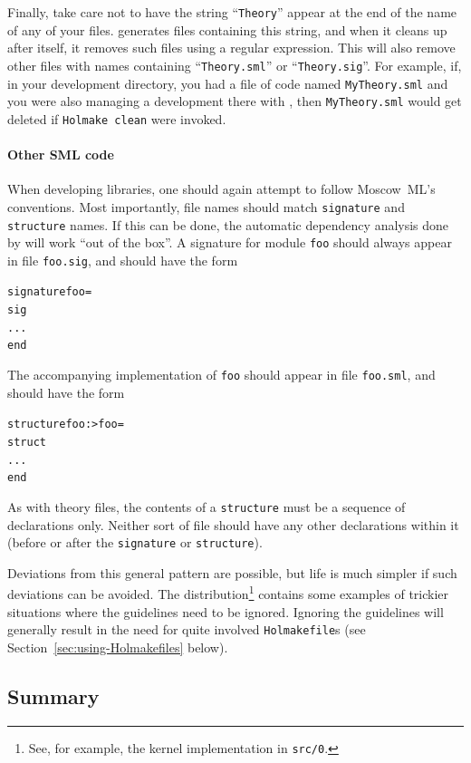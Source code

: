 Finally, take care not to have the string ``\texttt{Theory}'' appear at the end of the name of any of your files.
\HOL{} generates files containing this string, and when it cleans up after itself, it removes such files using a regular expression.
This will also remove other files with names containing ``\texttt{Theory.sml}'' or ``\texttt{Theory.sig}''.
For example, if, in your development directory, you had a file of \ML{} code named \texttt{MyTheory.sml} and you were also managing a \HOL{} development there with \holmake, then \texttt{MyTheory.sml} would get deleted if \texttt{Holmake~clean} were invoked.

\paragraph{Other SML code}
When developing \HOL{} libraries, one should again attempt to follow Moscow~ML's conventions.
Most importantly, file names should match \texttt{signature} and \texttt{structure} names.
If this can be done, the automatic dependency analysis done by \holmake{} will work ``out of the box''.
A signature for module \texttt{foo} should always appear in file \texttt{foo.sig}, and should have the form
\begin{alltt}
    signature foo =
    sig
      ...
    end
\end{alltt}
The accompanying implementation of \texttt{foo} should appear in file \texttt{foo.sml}, and should have the form
\begin{alltt}
    structure foo :> foo =
    struct
    ...
    end
\end{alltt}
As with theory files, the contents of a \texttt{structure} must be a sequence of declarations only.
Neither sort of file should have any other declarations within it (before or after the \texttt{signature} or \texttt{structure}).

Deviations from this general pattern are possible, but life is much simpler if such deviations can be avoided.
The \HOL{} distribution\footnote{See, for example, the kernel implementation in \texttt{src/0}.} contains some examples of trickier situations where the guidelines need to be ignored.
Ignoring the guidelines will generally result in the need for quite involved \texttt{Holmakefile}s (see Section~\ref{sec:using-Holmakefiles} below).

\subsection{Summary}

